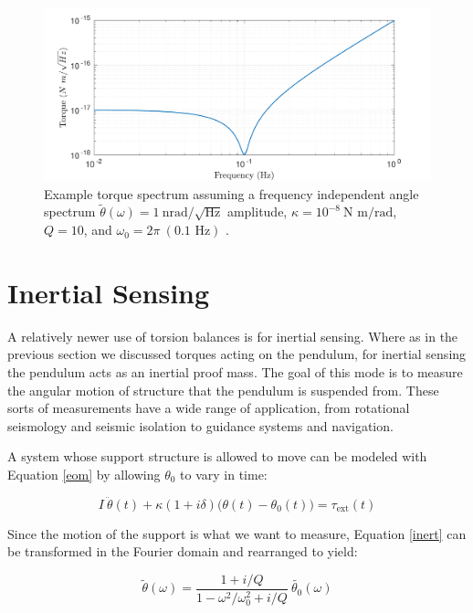 \documentclass{book}
\begin{document}
\begin{figure}[!h]
\begin{centering}
\includegraphics[width=\textwidth]{TorqueSpectrum.pdf}
\caption{Example torque spectrum assuming a frequency independent angle spectrum $\tilde{\theta}(\omega) = 1\ \text{nrad}/\sqrt{\text{Hz}}$ amplitude, $\kappa=10^{-8}\ \text{N m/rad}$, $Q=10$, and $\omega_0=2\pi\ (0.1 \text{ Hz})$ .}\label{torqSpec}
\end{centering}
\end{figure}
\pagebreak
\section{Inertial Sensing}\label{inertSection}

\quad A relatively newer use of torsion balances is for inertial sensing. Where as in the previous section we discussed torques acting on the pendulum, for inertial sensing the pendulum acts as an inertial proof mass. The goal of this mode is to measure the angular motion of structure that the pendulum is suspended from. These sorts of measurements have a wide range of application, from rotational seismology and seismic isolation to guidance systems and navigation. 

A system whose support structure is allowed to move can be modeled with Equation \ref{eom} by allowing $\theta_0$ to vary in time:

\begin{equation}
I~\ddot{\theta}(t)+\kappa(1+i\delta)  \big(\theta(t)-\theta_0(t)\big) = \tau_{\text{ext}}(t) \label{inert}
\end{equation}

Since the motion of the support is what we want to measure, Equation \ref{inert} can be transformed in the Fourier domain and rearranged to yield:

\begin{equation}
\tilde{\theta}(\omega)=\frac{1+i/Q}{1-\omega^2/\omega_0^2+i/Q}\ \tilde{\theta_0}(\omega) \label{inert2}
\end{equation}
\end{document}
